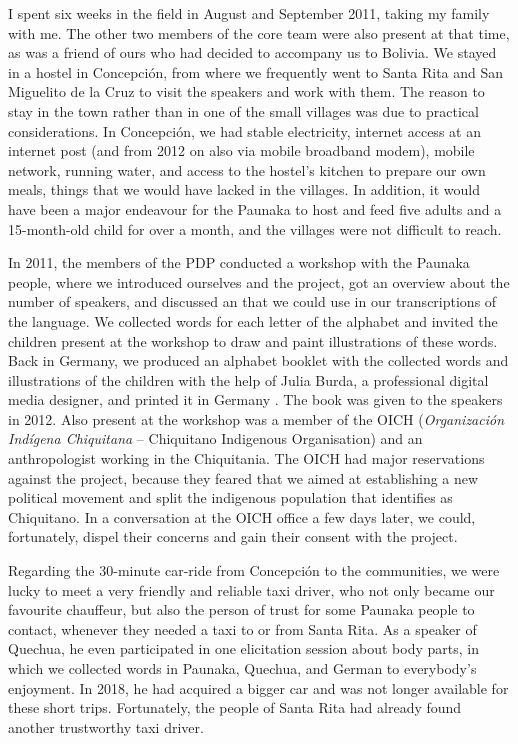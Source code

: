I spent six weeks in the field in August and September 2011, taking my family with me. The other two members of the core team were also present at that time, as was a friend of ours who had decided to accompany us to Bolivia. We stayed in a hostel in Concepción, from where we frequently went to Santa Rita and San Miguelito de la Cruz to visit the speakers and work with them. The reason to stay in the town rather than in one of the small villages was due to practical considerations. In Concepción, we had stable electricity, internet access at an internet post (and from 2012 on also via mobile broadband modem), mobile network, running water, and access to the hostel’s kitchen to prepare our own meals, things that we would have lacked in the villages. In addition, it would have been a major endeavour for the Paunaka to host and feed five adults and a 15-month-old child for over a month, and the villages were not difficult to reach.

In 2011, the members of the PDP conducted a workshop with the Paunaka people, where we introduced ourselves and the project, got an overview about the number of speakers, and discussed an  that we could use in our transcriptions of the language. We collected words for each letter of the alphabet and invited the children present at the workshop to draw and paint illustrations of these words. Back in Germany, we produced an alphabet booklet with the collected words and illustrations of the children with the help of Julia Burda, a professional digital media designer, and printed it in Germany \citep[]{PDP2012}. The book was given to the speakers in 2012. Also present at the workshop was a member of the OICH (\textit{Organización Indígena Chiquitana} – Chiquitano Indigenous Organisation) and an anthropologist working in the Chiquitania. The OICH had major reservations against the project, because they feared that we aimed at establishing a new political movement and split the indigenous population that identifies as Chiquitano. In a conversation at the OICH office a few days later, we could, fortunately, dispel their concerns and gain their consent with the project.

Regarding the 30-minute car-ride from Concepción to the communities, we were lucky to meet a very friendly and reliable taxi driver, who not only became our favourite chauffeur, but also the person of trust for some Paunaka people to contact, whenever they needed a taxi to or from Santa Rita. As a speaker of Quechua, he even participated in one elicitation session about body parts, in which we collected words in Paunaka, Quechua, and German to everybody's enjoyment. In 2018, he had acquired a bigger car and was not longer available for these short trips. Fortunately, the people of Santa Rita had already found another trustworthy taxi driver.

